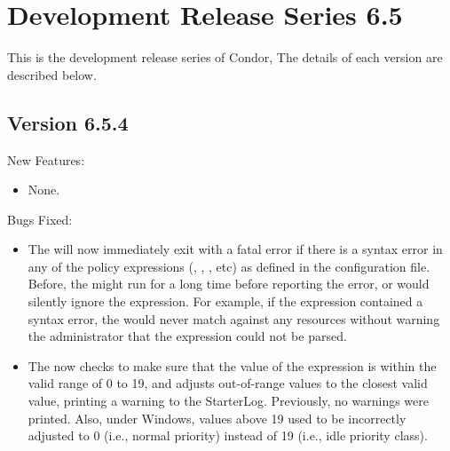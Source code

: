 \section{\label{sec:History-6-5}Development Release Series 6.5}

This is the development release series of Condor,
The details of each version are described below.

\subsection{\label{sec:New-6-5-4}Version 6.5.4}

\noindent New Features:

\begin{itemize}

\item None.

\end{itemize}

\noindent Bugs Fixed:

\begin{itemize}

\item The  will now immediately exit with a fatal error
  if there is a syntax error in any of the policy expressions
  (, , , etc) as
  defined in the configuration file.
  Before, the  might run for a long time before
  reporting the error, or would silently ignore the expression.
  For example, if the  expression contained a syntax
  error, the  would never match against any resources
  without warning the administrator that the 
  expression could not be parsed.

\item The  now checks to make sure that the value of
      the  expression is within the
      valid range of 0 to 19, and adjusts out-of-range values to the
      closest valid value, printing a warning to the StarterLog.
      Previously, no warnings were printed.  Also, under Windows,
      values above 19 used to be incorrectly adjusted to 0 (i.e.,
      normal priority) instead of 19 (i.e., idle priority class).

\end{itemize}

